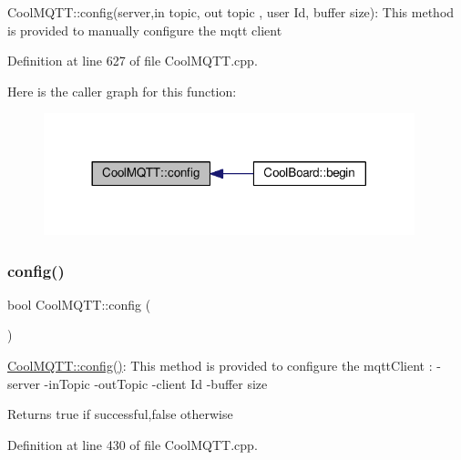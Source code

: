 Cool\+M\+Q\+T\+T\+::config(server,in topic, out topic , user Id, buffer size)\+: This method is provided to manually configure the mqtt client 

Definition at line 627 of file Cool\+M\+Q\+T\+T.\+cpp.

Here is the caller graph for this function\+:
\nopagebreak
\begin{figure}[H]
\begin{center}
\leavevmode
\includegraphics[width=305pt]{class_cool_m_q_t_t_a9b703de4f1358f0ee7a5e8c44979c648_icgraph}
\end{center}
\end{figure}
\mbox{\label{class_cool_m_q_t_t_a6571671781a505feca9a8a56e256c6bc}} 
\subsubsection{\texorpdfstring{config()}{config()}\hspace{0.1cm}{\footnotesize\ttfamily [2/2]}}
{\footnotesize\ttfamily bool Cool\+M\+Q\+T\+T\+::config (\begin{DoxyParamCaption}{ }\end{DoxyParamCaption})}

\hyperlink{class_cool_m_q_t_t_a6571671781a505feca9a8a56e256c6bc}{Cool\+M\+Q\+T\+T\+::config()}\+: This method is provided to configure the mqtt\+Client \+: -\/server -\/in\+Topic -\/out\+Topic -\/client Id -\/buffer size

\begin{DoxyReturn}{Returns}
true if successful,false otherwise 
\end{DoxyReturn}


Definition at line 430 of file Cool\+M\+Q\+T\+T.\+cpp.

\mbox{\label{class_cool_m_q_t_t_a50075d0ab23a327ab897fd6adad20eda}} 
